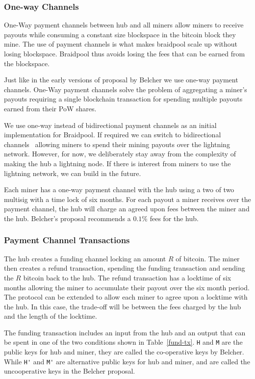 \documentclass{article}
\begin{document}
\subsubsection{One-way Channels}

One-Way payment channels between hub and all miners allow miners to
receive payouts while consuming a constant size blockspace in the
bitcoin block they mine. The use of payment channels is what makes
braidpool scale up without losing blockspace. Braidpool thus avoids
losing the fees that can be earned from the blockspace.

Just like in the early versions of proposal by Belcher we use one-way
payment channels. One-Way payment channels solve the problem of
aggregating a miner's payouts requiring a single blockchain
transaction for spending multiple payouts earned from their PoW
shares.

We use one-way instead of bidirectional payment channels as an initial
implementation for Braidpool. If required we can switch to
bidirectional channels~\cite{poon2016bitcoin} allowing miners to spend
their mining payouts over the lightning network. However, for now, we
deliberately stay away from the complexity of making the hub a
lightning node. If there is interest from miners to use the lightning
network, we can build in the future.

Each miner has a one-way payment channel with the hub using a two of
two multisig with a time lock of six months. For each payout a miner
receives over the payment channel, the hub will charge an agreed upon
fees between the miner and the hub. Belcher's proposal recommends a
$0.1\%$ fees for the hub.

\subsubsection{Payment Channel Transactions}

The hub creates a funding channel locking an amount $R$ of
bitcoin. The miner then creates a refund transaction, spending the
funding transaction and sending the $R$ bitcoin back to the hub. The
refund transaction has a locktime of six months allowing the miner to
accumulate their payout over the six month period. The protocol can be
extended to allow each miner to agree upon a locktime with the hub. In
this case, the trade-off will be between the fees charged by the hub
and the length of the locktime.

The funding transaction includes an input from the hub and an output
that can be spent in one of the two conditions shown in
Table~\ref{fund-tx}. \verb|H| and \verb|M| are the public keys for hub
and miner, they are called the co-operative keys by Belcher. While
\verb|H'| and \verb|M'| are alternative public keys for hub and miner,
and are called the uncooperative keys in the Belcher proposal.
\end{document}
